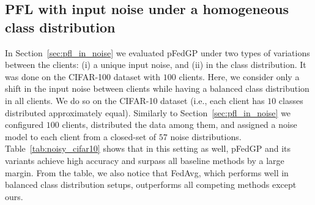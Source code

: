 \documentclass{article}
\def\Secref#1{Section~\ref{#1}}
\newcommand{\tblref}[1]{Table~\ref{#1}}
\begin{document}
\subsection{PFL with input noise under a homogeneous class distribution} \label{sec:in_noise_cifar10}
In \Secref{sec:pfl_in_noise} we evaluated pFedGP under two types of variations between the clients: (i) a unique input noise, and (ii) in the class distribution. It was done on the CIFAR-100 dataset with $100$ clients. Here, we consider only a shift in the input noise between clients while having a balanced class distribution in all clients. We do so on the CIFAR-10 dataset (i.e., each client has $10$ classes distributed approximately equal). Similarly to \Secref{sec:pfl_in_noise} we configured $100$ clients, distributed the data among them, and assigned a noise model to each client from a closed-set of $57$ noise distributions. \tblref{tab:noisy_cifar10} shows that in this setting as well, pFedGP and its variants achieve high accuracy and surpass all baseline methods by a large margin. From the table, we also notice that FedAvg, which performs well in balanced class distribution setups, outperforms all competing methods except ours.
\begin{table}[!t]
\setlength{\tabcolsep}{3pt}
\caption{pFedGP-IP-compute vs. pFedGP full model test accuracy and average predictive posterior inference run-time ($\pm$ STD) as a function of the number of inducing points (IPs) over 50 clients on CINIC-10.
}
\vskip 0.15in
\centering
{}
\label{tab:num_inducing}
\end{table}
\end{document}
